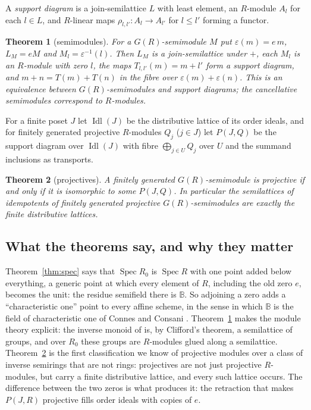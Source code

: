 \documentclass[11pt]{amsart}
\newtheorem{theorem}{Theorem}
\theoremstyle{remark}
\newcommand{\B}{\mathbb B}
\DeclareMathOperator{\Spec}{Spec}
\DeclareMathOperator{\Idl}{Idl}
\begin{document}
A \emph{support diagram} is a join-semilattice $L$ with least element, an $R$-module $A_l$ for each $l\in L$, and $R$-linear maps $\rho_{l,l'}\colon A_l\to A_{l'}$ for $l\le l'$ forming a functor.

\begin{theorem}[semimodules]\label{thm:mod}
For a $G(R)$-semimodule $M$ put $\varepsilon(m)=e\,m$, $L_M=eM$ and $M_l=\varepsilon^{-1}(l)$. Then $L_M$ is a join-semilattice under $+$, each $M_l$ is an $R$-module with zero $l$, the maps $T_{l,l'}(m)=m+l'$ form a support diagram, and $m+n=T(m)+T(n)$ in the fibre over $\varepsilon(m)+\varepsilon(n)$. This is an equivalence between $G(R)$-semimodules and support diagrams; the cancellative semimodules correspond to $R$-modules.
\end{theorem}

For a finite poset $J$ let $\Idl(J)$ be the distributive lattice of its order ideals, and for finitely generated projective $R$-modules $Q_j$ ($j\in J$) let $P(J,Q)$ be the support diagram over $\Idl(J)$ with fibre $\bigoplus_{j\in U}Q_j$ over $U$ and the summand inclusions as transports.

\begin{theorem}[projectives]\label{thm:proj}
A finitely generated $G(R)$-semimodule is projective if and only if it is isomorphic to some $P(J,Q)$. In particular the semilattices of idempotents of finitely generated projective $G(R)$-semimodules are exactly the finite distributive lattices.
\end{theorem}

\subsection{What the theorems say, and why they matter}
Theorem~\ref{thm:spec} says that $\Spec R_0$ is $\Spec R$ with one point added below everything, a generic point at which every element of $R$, including the old zero $e$, becomes the unit: the residue semifield there is $\B$. So adjoining a zero adds a ``characteristic one'' point to every affine scheme, in the sense in which $\B$ is the field of characteristic one of Connes and Consani \cite{CC}. Theorem~\ref{thm:mod} makes the module theory explicit: the inverse monoid of \cite[Proposition 6.1]{FGJM} is, by Clifford's theorem, a semilattice of groups, and over $R_0$ these groups are $R$-modules glued along a semilattice. Theorem~\ref{thm:proj} is the first classification we know of projective modules over a class of inverse semirings that are not rings: projectives are not just projective $R$-modules, but carry a finite distributive lattice, and every such lattice occurs. The difference between the two zeros is what produces it: the retraction that makes $P(J,R)$ projective fills order ideals with copies of $e$.
\end{document}
